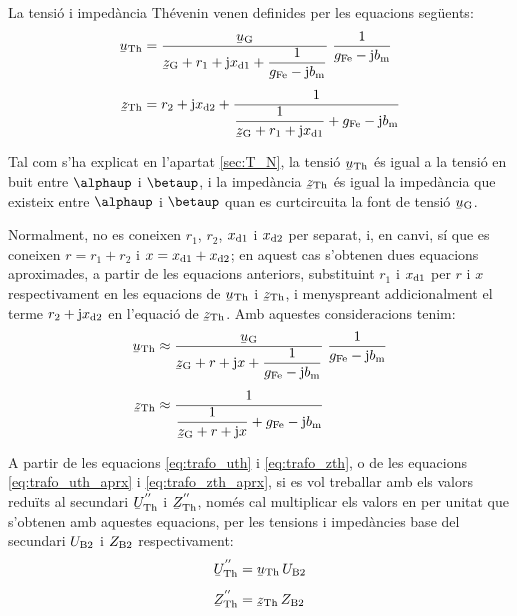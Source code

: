 La tensió i impedància Thévenin venen definides per les equacions
següents:
\begin{align}
    \cmplx{u}\ped{Th} &= \frac{\cmplx{u}\ped{G}}{\cmplx{z}\ped{G} + r_1 + \ju
    x\ped{d1} + \dfrac{1}{g\ped{Fe}-\ju b\ped{m}}} \;\frac{1}{g\ped{Fe}-\ju
    b\ped{m}} \label{eq:trafo_uth}\\[1ex]
    \cmplx{z}\ped{Th} &= r_2 + \ju x\ped{d2} + \frac{1}{\dfrac{1}{\cmplx{z}\ped{G} + r_1 +
    \ju x\ped{d1}} + g\ped{Fe}-\ju b\ped{m}}\label{eq:trafo_zth}
\end{align}

Tal com s'ha explicat en l'apartat \vref{sec:T_N}, la tensió
$\cmplx{u}\ped{Th}$ és igual a la tensió en buit entre $\alphaup$ i
$\betaup$, i la impedància $\cmplx{z}\ped{Th}$ és igual la impedància
que existeix entre $\alphaup$ i $\betaup$ quan es curtcircuita la font
de tensió $\cmplx{u}\ped{G}$.

Normalment, no es coneixen $r_1$, $r_2$, $x_\mathrm{d1}$ i $x_\mathrm{d2}$ per separat, i, en canvi, sí que es coneixen $r=r_1+r_2$ i $x=x_\mathrm{d1}+x_\mathrm{d2}$; en aquest
cas s'obtenen dues equacions aproximades, a partir de les equacions
anteriors, substituint $r_1$ i $x_\mathrm{d1}$ per $r$ i $x$ respectivament en
les equacions de $\cmplx{u}\ped{Th}$ i $\cmplx{z}\ped{Th}$, i
menyspreant addicionalment el terme $r_2 + \mathrm{j} x_\mathrm{d2}$ en l'equació
de $\cmplx{z}\ped{Th}$. Amb aquestes consideracions tenim:
\begin{align}
    \cmplx{u}\ped{Th} &\approx \frac{\cmplx{u}\ped{G}}{\cmplx{z}\ped{G} + r + \ju
    x + \dfrac{1}{g\ped{Fe}-\ju b\ped{m}}} \;\frac{1}{g\ped{Fe}-\ju
    b\ped{m}} \label{eq:trafo_uth_aprx}\\[1ex]
    \cmplx{z}\ped{Th} &\approx \frac{1}{\dfrac{1}{\cmplx{z}\ped{G} + r +
    \ju x} + g\ped{Fe}-\ju b\ped{m}}\label{eq:trafo_zth_aprx}
\end{align}

A partir de les equacions \eqref{eq:trafo_uth} i
\eqref{eq:trafo_zth}, o de les equacions \eqref{eq:trafo_uth_aprx} i
\eqref{eq:trafo_zth_aprx}, si es vol treballar amb els valors
reduïts al secundari $\cmplx{U}\ped{Th}^{''}$ i
$\cmplx{Z}\ped{Th}^{''}$, només cal multiplicar els valors en per unitat
que s'obtenen amb aquestes equacions, per les tensions i impedàncies
base del secundari $U_\mathrm{B2}$ i $Z_\mathrm{B2}$ respectivament:
\begin{align}
    \cmplx{U}\ped{Th}^{''} &= \cmplx{u}\ped{Th} \, U\ped{B2} \\[1ex]
    \cmplx{Z}\ped{Th}^{''} &= \cmplx{z}\ped{Th} \, Z\ped{B2}
\end{align}


